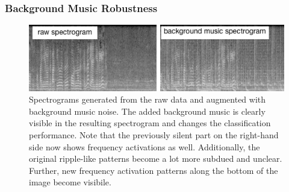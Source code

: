 \subsubsection{Background Music Robustness}
\label{sec:music_robustness}

	\begin{figure}[]
  		\centering
    	\includegraphics[width=\textwidth, keepaspectratio]{img/background_music.png}
    	\caption{Spectrograms generated from the raw data and augmented with background music noise. The added background music is clearly visible in the resulting spectrogram and changes the classification performance. Note that the previously silent part on the right-hand side now shows frequency activations as well. Additionally, the original ripple-like patterns become a lot more subdued and unclear. Further, new frequency activation patterns along the bottom of the image become visibile.}
    	\label{fig:background_music}
	\end{figure}
	
